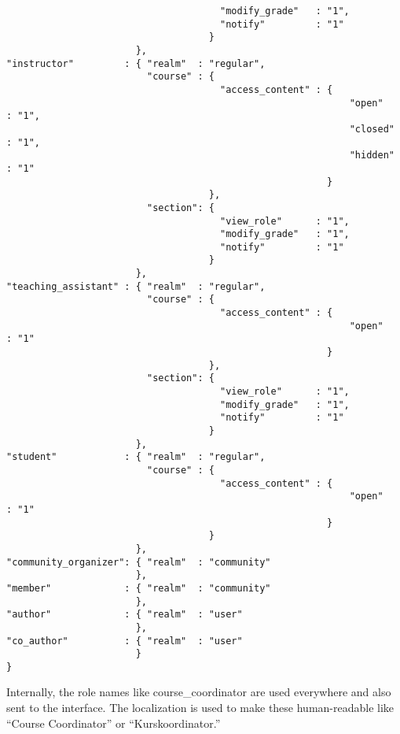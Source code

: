 \begin{verbatim}
                                      "modify_grade"   : "1",
                                      "notify"         : "1"
                                    }
                       },
"instructor"         : { "realm"  : "regular",
                         "course" : { 
                                      "access_content" : {
                                                             "open"               : "1",
                                                             "closed"             : "1",
                                                             "hidden"             : "1"
                                                         }
                                    },
                         "section": {
                                      "view_role"      : "1",
                                      "modify_grade"   : "1",
                                      "notify"         : "1"
                                    }
                       },
"teaching_assistant" : { "realm"  : "regular",
                         "course" : { 
                                      "access_content" : {
                                                             "open"               : "1"
                                                         }
                                    },
                         "section": {
                                      "view_role"      : "1",
                                      "modify_grade"   : "1",
                                      "notify"         : "1"
                                    }
                       },
"student"            : { "realm"  : "regular",
                         "course" : {
                                      "access_content" : {
                                                             "open"               : "1"
                                                         }
                                    }
                       },
"community_organizer": { "realm"  : "community"
                       },
"member"             : { "realm"  : "community"
                       },
"author"             : { "realm"  : "user"
                       },
"co_author"          : { "realm"  : "user"
                       }
}

\end{verbatim}
Internally, the role names like course\_coordinator are used everywhere and also sent to the interface. The localization is used to make these human-readable like ``Course Coordinator'' or ``Kurskoordinator.''


